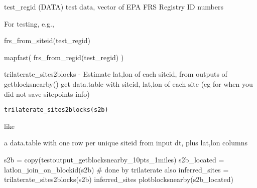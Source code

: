 \documentclass[a4paper]{book}
\begin{document}
%
\begin{Description}\relax
test\_regid (DATA) test data, vector of EPA FRS Registry ID numbers
\end{Description}
%
\begin{Details}\relax
For testing, e.g.,

frs\_from\_siteid(test\_regid)

mapfast(  frs\_from\_regid(test\_regid)  )
\end{Details}
%
\begin{Description}\relax
trilaterate\_sites2blocks - Estimate lat,lon of each siteid, from outputs of getblocksnearby()
get data.table with siteid, lat,lon of each site (eg for when you did not save sitepoints info)
\end{Description}
%
\begin{Usage}
\begin{verbatim}
trilaterate_sites2blocks(s2b)
\end{verbatim}
\end{Usage}
%
\begin{Arguments}
\begin{ldescription}
\item[\code{s2b}] like 
\end{ldescription}
\end{Arguments}
%
\begin{Value}
a data.table with one row per unique siteid from input dt,
plus lat,lon columns
\end{Value}
%
\begin{Examples}
\begin{ExampleCode}
s2b = copy(testoutput_getblocksnearby_10pts_1miles)
s2b_located = latlon_join_on_blockid(s2b) # done by trilaterate also
inferred_sites = trilaterate_sites2blocks(s2b)
inferred_sites
plotblocksnearby(s2b_located)

\end{ExampleCode}
\end{Examples}
\end{document}
